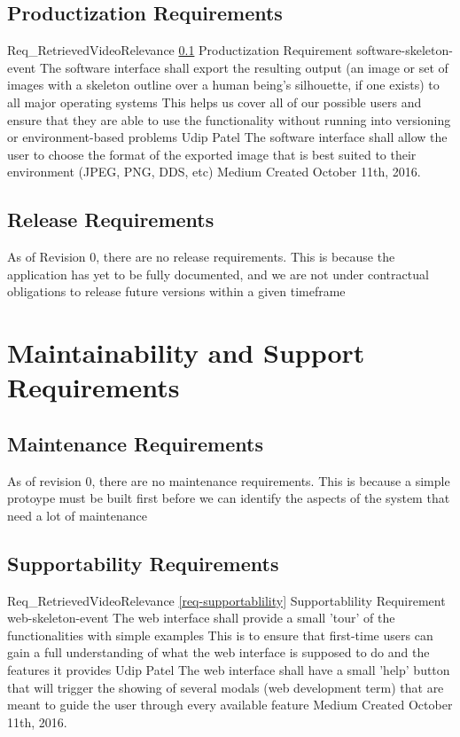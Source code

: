 \documentclass{scrreprt}
\begin{document}
\subsection{Productization Requirements}
\label{req-product}

\requirement
{Req_RetrievedVideoRelevance}
{\ref{req-product} Productization Requirement}
{software-skeleton-event}
{The software interface shall export the resulting output (an image or set of images with a skeleton outline over a human being's silhouette, if one exists) to all major operating systems }
{This helps us cover all of our possible users and ensure that they are able to use the functionality without running into versioning or environment-based problems}
{Udip Patel}
{The software interface shall allow the user to choose the format of the exported image that is best suited to their environment (JPEG, PNG, DDS, etc) }
{Medium}
{Created October 11th, 2016.}




\subsection{Release Requirements}
\label{req-release}
As of Revision 0, there are no release requirements. This is because the application has yet to be fully documented, and we are not under contractual obligations to release future versions within a given timeframe


\section{Maintainability and Support Requirements}

\subsection{Maintenance Requirements}
\label{req-maintenance}

As of revision 0, there are no maintenance requirements. This is because a simple protoype must be built first before we can identify the aspects of the system that need a lot of maintenance

\subsection{Supportability Requirements}
\label{req-supportability}

\requirement
{Req_RetrievedVideoRelevance}
{\ref{req-supportablility} Supportablility Requirement}
{web-skeleton-event}
{The web interface shall provide a small 'tour' of the functionalities with simple examples}
{This is to ensure that first-time users can gain a full understanding of what the web interface is supposed to do and the features it provides}
{Udip Patel}
{The web interface shall have a small 'help' button that will trigger the showing of several modals (web development term) that are meant to guide the user through every available feature}
{Medium}
{Created October 11th, 2016.}
\end{document}
